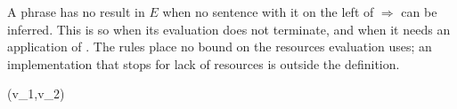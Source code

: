 A phrase has no result in $E$ when no sentence with it on the left of
$\Rightarrow$ can be inferred. This is so when its evaluation does not
terminate, and when it needs an application of . %
The rules place no bound on the resources evaluation uses; an implementation
that stops for lack of resources is outside the definition. %







  {
       {(v_1,v_2)}}


  {}

  {}


  {}

